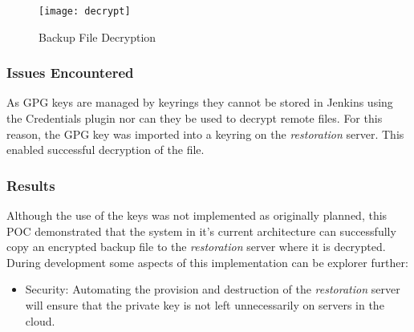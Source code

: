 	\begin{figure}[H]
		\caption{Backup File Decryption}
		\centering
		\texttt{[image: decrypt]}
		\label{fig:decrypt}
	\end{figure}
	
	\subsubsection{Issues Encountered}
	As GPG keys are managed by keyrings they cannot be stored in Jenkins using the Credentials plugin nor can they be used to decrypt remote files. For this reason, the GPG key was imported into a keyring on the \textit{restoration} server. This enabled successful decryption of the file.
	
	\subsubsection{Results}
	Although the use of the keys was not implemented as originally planned, this POC demonstrated that the system in it's current architecture can successfully copy an encrypted backup file to the \textit{restoration} server where it is decrypted. During development some aspects of this implementation can be explorer further:
	\begin{itemize}
		\item Security: Automating the provision and destruction of the \textit{restoration} server will ensure that the private key is not left unnecessarily on servers in the cloud. 
	\end{itemize}
	